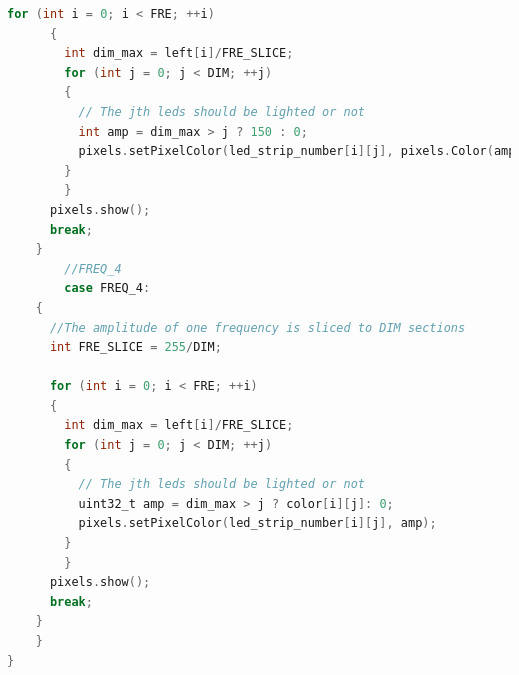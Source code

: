 \documentclass[12pt,a4paper,journal]{IEEEtran}
\begin{document}
\begin{lstlisting}[language={C}, caption=main.cpp, keywordstyle=\color{blue!70}, commentstyle=\color{red!50!green!50!blue!50}, rulesepcolor=\color{red!20!green!20!blue!20}]
      for (int i = 0; i < FRE; ++i)
      {
        int dim_max = left[i]/FRE_SLICE;
        for (int j = 0; j < DIM; ++j)
        {
          // The jth leds should be lighted or not
          int amp = dim_max > j ? 150 : 0;
          pixels.setPixelColor(led_strip_number[i][j], pixels.Color(amp,0,0));
        }  
        }
      pixels.show();
      break;
    }
        //FREQ_4
        case FREQ_4:
    {
      //The amplitude of one frequency is sliced to DIM sections
      int FRE_SLICE = 255/DIM;

      for (int i = 0; i < FRE; ++i)
      {
        int dim_max = left[i]/FRE_SLICE;
        for (int j = 0; j < DIM; ++j)
        {
          // The jth leds should be lighted or not
          uint32_t amp = dim_max > j ? color[i][j]: 0;
          pixels.setPixelColor(led_strip_number[i][j], amp);
        }  
        }
      pixels.show();
      break;
    }
    }
}
\end{lstlisting}
\end{document}
